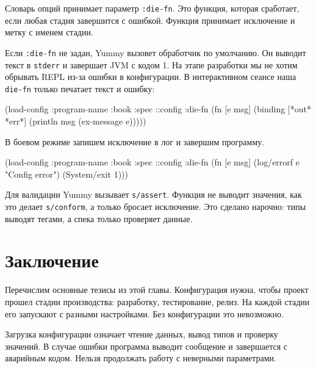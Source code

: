 
Словарь опций принимает параметр \verb|:die-fn|. Это функция, которая
сработает, если любая стадия завершится с ошибкой. Функция принимает исключение
и метку с именем стадии.


Если \verb|:die-fn| не задан, Yummy вызовет обработчик по умолчанию. Он
выводит текст в \verb|stderr| и завершает JVM с кодом 1. На этапе разработки
мы не хотим обрывать REPL из-за ошибки в конфигурации. В интерактивном сеансе
наша \verb|die-fn| только печатает текст и ошибку:

\begin{english}
  \begin{clojure}
(load-config
 {:program-name :book
  :spec ::config
  :die-fn (fn [e msg]
            (binding [*out* *err*]
              (println msg (ex-message e))))})
  \end{clojure}
\end{english}

\noindent
В боевом режиме запишем исключение в лог и завершим программу.


\begin{english}
  \begin{clojure}
(load-config
 {:program-name :book
  :spec ::config
  :die-fn (fn [e msg]
            (log/errorf e "Config error")
            (System/exit 1))})
  \end{clojure}
\end{english}

Для валидации Yummy вызывает \verb|s/assert|. Функция не выводит значения, как
это делает \verb|s/conform|, а только бросает исключение. Это сделано нарочно:
типы выводят тегами, а спека только проверяет данные.

\section{Заключение}

Перечислим основные тезисы из этой главы. Конфигурация нужна, чтобы проект
прошел стадии производства: разработку, тестирование, релиз. На каждой стадии
его запускают с разными настройками. Без конфигурации это невозможно.

Загрузка конфигурации означает чтение данных, вывод типов и проверку значений. В
случае ошибки программа выводит сообщение и завершается с аварийным
кодом. Нельзя продолжать работу с неверными параметрами.

